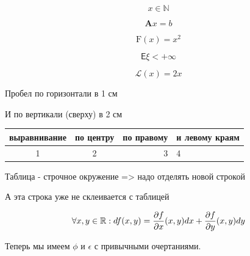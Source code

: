 \[
  x \in \mathbb{N}
\]

\[
  \mathbf{A}x=b
\]

\[
  \mathrm{F}(x)=x^2
\]

\[
  \mathsf{E}\xi < +\infty
\]

\[
  \mathcal{L}(x)=2x
\]



\newpage
Пробел \hspace{1cm} по горизонтали в 1 см

\vspace{2cm}
И по вертикали (сверху) в 2 см


\newpage






\begin{tabular}{||c|c|||r|l||}
  \hline %
  выравнивание & по центру & по правому & и левому краям \\
  \hline
  1 & 2 & 3 & 4 \\
  \hline
\end{tabular}
Таблица - строчное окружение => надо отделять новой строкой

А эта строка уже не склеивается с таблицей


\[
  \forall x, y \in \mathbb{R}: df(x, y) = \frac{\partial{f}}{\partial{x}}(x, y)dx + \frac{\partial{f}}{\partial{y}}(x, y)dy
\]

Теперь мы имеем $ \phi $ и $ \epsilon $ с привычными очертаниями.

